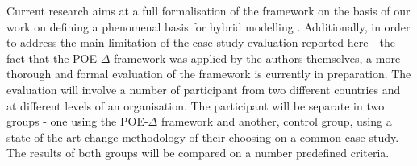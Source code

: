 \documentclass[runningheads,a4paper]{llncs}
\begin{document}
Current research aims at a full formalisation of the framework on the basis of our work on defining a phenomenal basis for hybrid modelling \cite{hall2017phenomenal}. Additionally, in order to address the main limitation of the case study evaluation reported here - the fact that the POE-$\Delta$ framework was applied by the authors themselves, a more thorough and formal evaluation of the framework is currently in preparation. The evaluation will involve a number of participant from two different countries and at different levels of an organisation. The participant will be separate in two groups - one using the POE-$\Delta$ framework and another, control group, using a state of the art change methodology of their choosing on a common case study. The results of both groups will be compared on a number predefined criteria.

\frenchspacing


\end{document}
